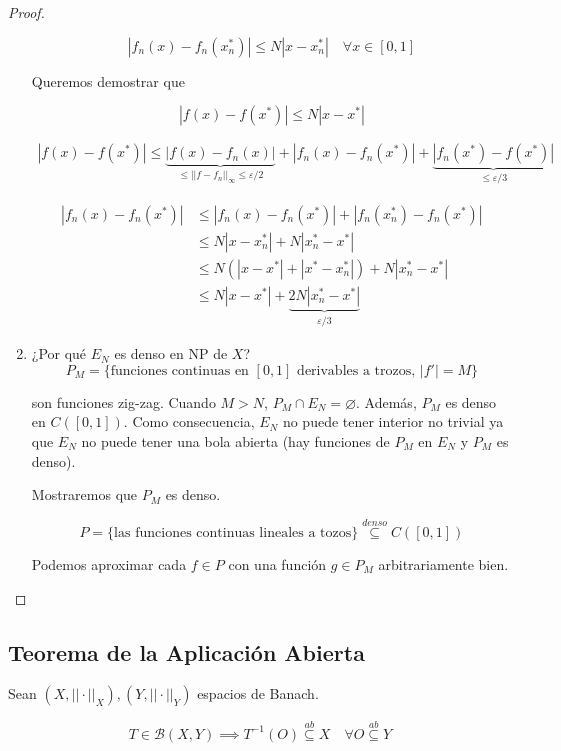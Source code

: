 \begin{proof}
\begin{enumerate}
        \[|f_n(x)-f_n(x_n^*)|\leq N|x-x_n^*|\quad \forall x\in[0,1]\]

        Queremos demostrar que 

        \[|f(x)-f(x^*)|\leq N|x-x^*|\]

        \begin{align*}
            |f(x)-f(x^*)|\leq \underbrace{|f(x)-f_n(x)|}_{\leq ||f-f_n||_\infty\leq \varepsilon/2}+|f_n(x)-f_n(x^*)|+\underbrace{|f_n(x^*)-f(x^*)|}_{\leq \varepsilon/3}
        \end{align*}

        \begin{align*}
            |f_n(x)-f_n(x^*)|&\leq |f_n(x)-f_n(x^*)|+|f_n(x_n^*)-f_n(x^*)|\\
            &\leq N|x-x_n^*|+N|x_n^*-x^*|\\
            &\leq N(|x-x^*|+|x^*-x_n^*|)+N|x_n^*-x^*|\\
            &\leq N|x-x^*|+\underbrace{2N|x_n^*-x^*|}_{\varepsilon/3}
        \end{align*}

        \item ¿Por qué $E_N$ es denso en NP de $X$?
        \[P_M=\{\text{funciones continuas en $[0,1]$ derivables a trozos, }|f'|=M\}\]

        son funciones zig-zag. Cuando $M>N$, $P_M\cap E_N=\varnothing$. Además, $P_M$ es denso en $C([0,1])$.
        Como consecuencia, $E_N$ no puede tener interior no trivial ya que $E_N$ no puede tener una bola abierta (hay funciones de $P_M$ en $E_N$ y $P_M$ es denso).

        Mostraremos que  $P_M$ es denso.

        \[P=\{\text{las funciones continuas lineales a tozos}\}\overset{denso}{\subseteq}C([0,1])\]

        Podemos aproximar cada $f\in P$ con una función $g\in P_M$ arbitrariamente bien.
    \end{enumerate}
\end{proof}

\subsection{Teorema de la Aplicación Abierta}

Sean $(X,||\cdot||_X),(Y,||\cdot||_Y)$ espacios de Banach.

\[T\in \mathcal{B}(X,Y)\implies T^{-1}(O)\overset{ab}{\subseteq}X\quad \forall O\overset{ab}{\subseteq}Y\]

